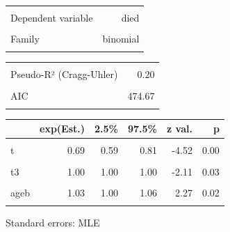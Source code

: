 \documentclass[
  12pt,
  letterpaper,
  DIV=11,
  numbers=noendperiod,
  onepage,
  openany]{scrreprt}
\begin{document}
\begin{table}[!h]
\centering
\begin{tabular}{lr}
\toprule
\cellcolor{gray!6}{Observations} & \cellcolor{gray!6}{1127}\\
Dependent variable & died\\
\cellcolor{gray!6}{Type} & \cellcolor{gray!6}{Generalized linear model}\\
Family & binomial\\
\cellcolor{gray!6}{Link} & \cellcolor{gray!6}{logit}\\
\bottomrule
\end{tabular}
\end{table} \begin{table}[!h]
\centering
\begin{tabular}{lr}
\toprule
\cellcolor{gray!6}{$\chi^2$(6)} & \cellcolor{gray!6}{90.69}\\
Pseudo-R² (Cragg-Uhler) & 0.20\\
\cellcolor{gray!6}{Pseudo-R² (McFadden)} & \cellcolor{gray!6}{0.16}\\
AIC & 474.67\\
\cellcolor{gray!6}{BIC} & \cellcolor{gray!6}{509.86}\\
\bottomrule
\end{tabular}
\end{table} \begin{table}[!h]
\centering
\begin{threeparttable}
\begin{tabular}{lrrrrr}
\toprule
  & exp(Est.) & 2.5\% & 97.5\% & z val. & p\\
\midrule
\cellcolor{gray!6}{(Intercept)} & \cellcolor{gray!6}{0.44} & \cellcolor{gray!6}{0.27} & \cellcolor{gray!6}{0.72} & \cellcolor{gray!6}{-3.29} & \cellcolor{gray!6}{0.00}\\
t & 0.69 & 0.59 & 0.81 & -4.52 & 0.00\\
\cellcolor{gray!6}{t2} & \cellcolor{gray!6}{1.01} & \cellcolor{gray!6}{1.00} & \cellcolor{gray!6}{1.02} & \cellcolor{gray!6}{2.83} & \cellcolor{gray!6}{0.00}\\
t3 & 1.00 & 1.00 & 1.00 & -2.11 & 0.03\\
\cellcolor{gray!6}{yearb} & \cellcolor{gray!6}{0.88} & \cellcolor{gray!6}{0.76} & \cellcolor{gray!6}{1.01} & \cellcolor{gray!6}{-1.80} & \cellcolor{gray!6}{0.07}\\
\addlinespace
ageb & 1.03 & 1.00 & 1.06 & 2.27 & 0.02\\
\cellcolor{gray!6}{surgery} & \cellcolor{gray!6}{0.36} & \cellcolor{gray!6}{0.15} & \cellcolor{gray!6}{0.88} & \cellcolor{gray!6}{-2.25} & \cellcolor{gray!6}{0.02}\\
\bottomrule
\end{tabular}
\begin{tablenotes}
\item Standard errors: MLE
\end{tablenotes}
\end{threeparttable}
\end{table}
\end{document}
